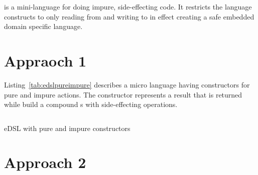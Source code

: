 \documentclass[thesis-solanki.tex]{subfiles}
\begin{document}
\begin{scope}
 is a mini-language for doing impure, side-effecting code. It restricts the language constructs to only reading 
from  and writing to  in effect creating a safe embedded domain specific language.  

\begin{comment}
\begin{code-list}[H]
\begin{singlespace}
  \inputminted[linenos]{haskell}{haskell-proto4-purvey-wincer.hs}
\end{singlespace}
\caption{\protect\haskellConstruct{IOAction} definitions}
\label{lis:IOAction}
\end{code-list}
\end{comment}




\section{Appraoch 1}

Listing~\ref{tab:edslpureimpure} describes a micro language having constructors for pure and impure actions. The 
constructor represents a result that is returned while  build a compound s
with side-effecting operations.

\begin{code-list}[H]
\begin{singlespace}
  \inputminted[linenos, firstline=12, lastline=21]{haskell}{haskell-proto4-myrtle-uppers.hs}
\end{singlespace}
\caption{eDSL with pure and impure constructors}
\label{tab:edslpureimpure}
\end{code-list}


\section{Approach 2}

\begin{comment}
So when the program is getting interpreted the interpreter encounters an IO operation which then gets "interpreted" to the above and it 
continues normally.

The interpreted program is still pure since the IO actions have not been executed 

if the running is done inside a monad then the IO still is pure.
\end{comment}



\end{scope}
\end{document}
